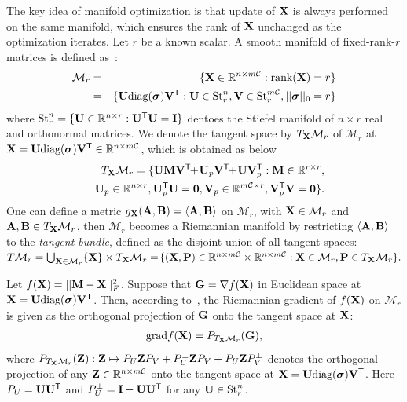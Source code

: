 \documentclass[letterpaper]{article}
\def\M{\mathcal{M}}
\def\R{{\mathbb R}}
\def\U{{\bf U}}
\def\V{{\bf V}}
\def\diag{\mbox{diag}}
\def\bsigma{\mbox{{\boldmath $\sigma$}}}
\def\trsp{{\sf T}}
\def\I{{\bf I}}
\def\0{{\bf 0}}
\def\G{{\bf G}}
\def\grad{{\text{grad}}}
\def\bZ{{\bf Z}}
\def\bA{{\bf A}}
\def\bB{{\bf B}}
\def\bM{{\bf M}}
\def\calC{{\mathcal{C}}}
\def\bX{{\bf X}}
\def\bA{{\bf A}}
\def\bX{{\bf X}}
\def\bP{{\bf P}}
\def\rank{{\text{rank}}}
\begin{document}
The key idea of manifold optimization is that update of $\bX$ is always performed on the same manifold, which ensures the rank of $\bX$ unchanged as the optimization iterates.
Let $r$ be a known scalar.
A smooth manifold of fixed-rank-$r$ matrices is defined as~\cite{vandereycken2013lowrank}:
{\small
\begin{eqnarray}
\M_{r} &=& \{\bX\in \R^{n\times m\calC}: \rank(\bX) = r\} \nonumber \\
       &=& \{\U\diag(\bsigma)\V^{\trsp}: \U \in \textrm{St}_{r}^{n}, \V \in
           \textrm{St}_{r}^{m\calC}, ||\bsigma||_0 = r\} \nonumber
\end{eqnarray}
}
\noindent
where $\textrm{St}_{r}^{n} = \{\U \in \R^{n\times r}:
\U^{\trsp}\U = \I \}$ dentoes the Stiefel manifold of $n\times r$ real and orthonormal matrices.
We denote the tangent space by $T_{\bX}\M_{r}$ of $\M_{r}$ at $\bX = \U\diag(\bsigma)\V^{\trsp} \in \R^{n \times m\calC}$,
which is obtained as below
{\small
\begin{eqnarray}\label{eq:tangent_vector}
&&T_{\bX}\M_{r} =  \{\U\bM\V^{\trsp} \!\!+\! \U_p\V^{\trsp} \!\!+\!
\U\V_p^{\trsp}: \bM \in \R^{r\times r}, \nonumber\\ && \U_p \in \R^{n\times r},
\U_p^{\trsp}\U = \0, \V_p \in \R^{m\calC \times r}, \V_p^{\trsp}\V = \0\}.
\end{eqnarray}
}
\noindent
One can define a metric $g_{\bX}({\bA},{\bB}) = \langle{\bA},{\bB}\rangle$ on $\M_{r}$,
with $\bX \in \M_{r}$ and ${\bA},{\bB} \in T_{\bX}\M_{r}$,
then $\M_{r}$ becomes a Riemannian manifold by restricting
$\langle\bA,\bB\rangle$
to the \emph{tangent bundle}, defined as the disjoint union of all tangent spaces:
$T\M_{r} = \bigcup_{\bX\in \M_{r}}\{\bX\} \times T_{\bX}\M_{r}
         = \! \{(\bX,\bP)\in \R^{n \times m\calC} \times \R^{n \times m\calC}: \bX \in \M_{r}, \bP \in T_{\bX}\M_{r}\}.$



Let $f(\bX) = || \bM - \bX ||_F^2$.
Suppose that $\G = \nabla f(\bX)$ in Euclidean space at $\bX = \U\diag(\bsigma)\V^{\trsp}$.
Then, according to~\cite{vandereycken2013lowrank}, the Riemannian gradient of $f(\bX)$ on $\M_r$ is given as the orthogonal
projection of $\G$ onto the tangent space at $\bX$:
{\small
\begin{eqnarray}\label{eq:grad}
\grad{f(\bX)} = P_{T_{\bX}\M_{r}}(\G)  ,
\end{eqnarray}
}
\noindent
where
$P_{T_{\bX}\M_{r}}(\bZ): \bZ \mapsto P_{U}\bZ P_{V} + P_{U}^{\perp} \bZ P_{V} + P_{U} \bZ P_{V}^{\perp}$
denotes the orthogonal projection of any
$\bZ \in \R^{n \times m\calC}$ onto the tangent space at $\bX = \U\diag(\bsigma)\V^{\trsp}$.
Here $P_U = \U \U^{\trsp}$ and $P_U^{\perp} = \I - \U \U^{\trsp}$ for any $\U \in \textrm{St}_{r}^{n}$.
\end{document}
